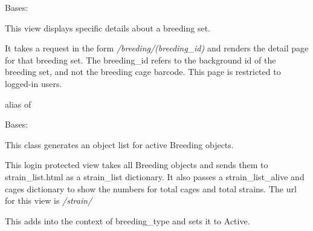 \documentclass[letterpaper,10pt,english]{sphinxmanual}
\begin{document}

\begin{fulllineitems}
\label{api:mousedb.animal.views.BreedingDetail}
Bases: {\hyperref[api:mousedb.views.ProtectedDetailView]{}}

This view displays specific details about a breeding set.

It takes a request in the form \emph{/breeding/(breeding\_id)} and renders the detail page for that breeding set.
The breeding\_id refers to the background id of the breeding set, and not the breeding cage barcode.
This page is restricted to logged-in users.


\begin{fulllineitems}
\label{api:mousedb.animal.views.BreedingDetail.model}
alias of 

\end{fulllineitems}


\end{fulllineitems}



\begin{fulllineitems}
\label{api:mousedb.animal.views.BreedingList}
Bases: {\hyperref[api:mousedb.views.ProtectedListView]{}}

This class generates an object list for active Breeding objects.

This login protected view takes all Breeding objects and sends them to strain\_list.html as a strain\_list dictionary.  It also passes a strain\_list\_alive and cages dictionary to show the numbers for total cages and total strains.
The url for this view is \emph{/strain/}


\begin{fulllineitems}
\label{api:mousedb.animal.views.BreedingList.get_context_data}
This adds into the context of breeding\_type and sets it to Active.

\end{fulllineitems}


\end{fulllineitems}
\end{document}
